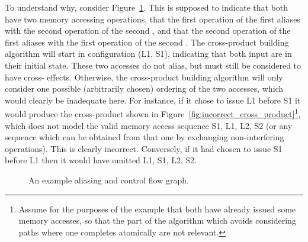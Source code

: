 To understand why, consider
Figure~\ref{fig:cross_product:example_aliasing}.  This is supposed to
indicate that both {\StateMachines} have two memory accessing
operations, that the first operation of the first {\StateMachine}
aliases with the second operation of the second {\StateMachine}, and
that the second operation of the first {\StateMachine} aliases with
the first operation of the second {\StateMachine}.  The cross-product
building algorithm will start in configuration (L1, S1), indicating
that both input {\StateMachines} are in their initial state.  These
two accesses do not alias, but must still be considered to have
cross-{\StateMachine} effects.  Otherwise, the cross-product building
algorithm will only consider one possible (arbitrarily chosen)
ordering of the two accesses, which would clearly be inadequate here.
For instance, if it chose to issue L1 before S1 it would produce the
cross-product {\StateMachine} shown in
Figure~\ref{fig:incorrect_cross_product}\footnote{Assume for the
  purposes of the example that both {\StateMachines} have already
  issued some memory accesses, so that the part of the algorithm which
  avoids considering paths where one {\StateMachine} completes
  atomically are not relevant.}, which does not model the valid memory
access sequence S1, L1, L2, S2 (or any sequence which can be obtained
from that one by exchanging non-interfering operations).  This is
clearly incorrect.  Conversely, if it had chosen to issue S1 before L1
then it would have omitted L1, S1, L2, S2.

\begin{figure}
  \caption{An example aliasing and control flow graph.}
  \label{fig:cross_product:example_aliasing}
\end{figure}

